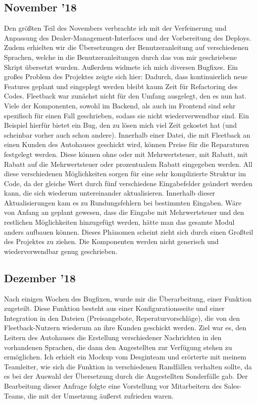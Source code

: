 \documentclass[a4paper, 11pt]{article}
\begin{document}
\subsection{November '18}
Den größten Teil des Novembers verbrachte ich mit der Verfeinerung und Anpassung des Dealer-Management-Interfaces und der Vorbereitung des Deploys. Zudem erhielten wir die Übersetzungen der Benutzeranleitung auf verschiedenen Sprachen, welche in die Benutzeranleitungen durch das von mir geschriebene Skript übersetzt wurden. Außerdem widmete ich mich diversen Bugfixes. Ein großes Problem des Projektes zeigte sich hier: Dadurch, dass kontinuierlich neue Features geplant und eingeplegt werden bleibt kaum Zeit für Refactoring des Codes. Fleetback war zunächst nicht für den Umfang ausgelegt, den es nun hat. Viele der Komponenten, sowohl im Backend, als auch im Frontend sind sehr spezifisch für einen Fall geschrieben, sodass sie nicht wiederverwendbar sind. Ein Beispiel hierfür bietet ein Bug, den zu lösen mich viel Zeit gekostet hat (und scheinbar vorher auch schon andere). Innerhalb einer Datei, die mit Fleetback an einen Kunden des Autohauses geschickt wird, können Preise für die Reparaturen festgelegt werden. Diese können ohne oder mit Mehrwertsteuer, mit Rabatt, mit Rabatt auf die Mehrwertsteuer oder prozentualem Rabatt eingegeben werden. All diese verschiedenen Möglichkeiten sorgen für eine sehr komplizierte Struktur im Code, da der gleiche Wert durch fünf verschiedene Eingabefelder geändert werden kann, die sich wiederum untereinander aktualisieren. Innerhalb dieser Aktualisierungen kam es zu Rundungsfehlern bei bestimmten Eingaben. Wäre von Anfang an geplant gewesen, dass die Eingabe mit Mehrwertsteuer und den restlichen Möglichkeiten hinzugefügt werden, hätte man das gesamte Modul anders aufbauen können. Dieses Phänomen scheint zieht sich durch einen Großteil des Projektes zu ziehen. Die Komponenten werden nicht generisch und wiederverwendbar genug geschrieben.

\subsection{Dezember '18}
Nach einigen Wochen des Bugfixen, wurde mir die Überarbeitung, einer Funktion zugeteilt. Diese Funktion besteht aus einer Konfigurationsseite und einer Integration in den Dateien (Preisangebote, Reperaturvorschläge), die von den Fleetback-Nutzern wiederum an ihre Kunden geschickt werden. Ziel war es, den Leitern des Autohauses die Erstellung verschiedener Nachrichten in den vorhandenen Sprachen, die dann den Angestellten zur Verfügung stehen zu ermöglichen. Ich erhielt ein Mockup vom Desginteam und erörterte mit meinem Teamleiter, wie sich die Funktion in verschiedenen Randfällen verhalten sollte, da es bei der Auswahl der Übersetzung durch die Angestellten Sonderfälle gab. Der Bearbeitung dieser Anfrage folgte eine Vorstellung vor Mitarbeitern des Sales-Teams, die mit der Umsetzung äußerst zufrieden waren.
\end{document}
